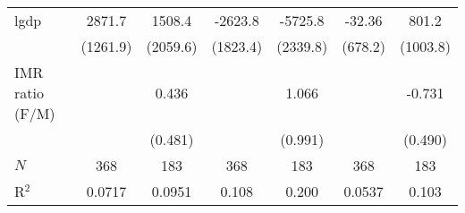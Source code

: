 \begin{table}[h!]
{\begin{tabular}{l*{6}{c}}
lgdp     &      2871.7\sym{**} &      1508.4         &     -2623.8         &     -5725.8\sym{**} &      -32.36         &       801.2         \\
            &    (1261.9)         &    (2059.6)         &    (1823.4)         &    (2339.8)         &     (678.2)         &    (1003.8)         \\
IMR ratio (F/M)&                     &       0.436         &                     &       1.066         &                     &      -0.731         \\
            &                     &     (0.481)         &                     &     (0.991)         &                     &     (0.490)         \\
\hline
\(N\)       &         368         &         183         &         368         &         183         &         368         &         183         \\
R$^2$          &      0.0717         &      0.0951         &       0.108         &       0.200         &      0.0537         &       0.103         \\
\bottomrule
\end{tabular}}
\end{table}

